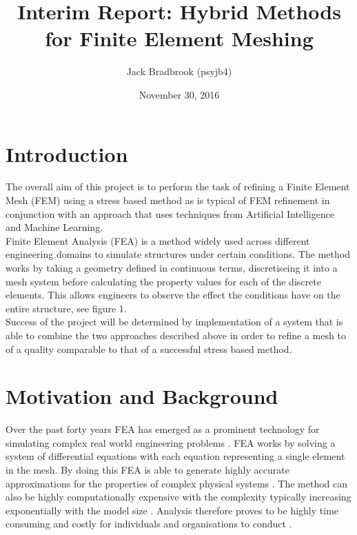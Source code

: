 \documentclass{article}
\begin{document}

\title{Interim Report: Hybrid Methods for Finite Element Meshing}
\author{Jack Bradbrook (psyjb4)}
\date{November 30, 2016}
\maketitle

\tableofcontents

\newpage

\section{Introduction}

The overall aim of this project is to perform the task of refining a Finite Element Mesh (FEM) using a stress based method as is typical of FEM refinement in conjunction with an approach that uses techniques from Artificial Intelligence and Machine Learning. \\

\noindent
Finite Element Analysis (FEA) is a method widely used across different engineering domains to simulate structures under certain conditions. The method works by taking a geometry defined in continuous terms, discretiseing it into a mesh system before calculating the property values for each of the discrete elements. This allows engineers to observe the effect the conditions have on the entire structure, see figure 1. \\ 

\noindent
Success of the project will be determined by implementation of a system that is able to combine the two approaches described above in order to refine a mesh to of a quality comparable to that of a successful stress based method.


\section{Motivation and Background}

Over the past forty years FEA has emerged as a prominent technology for simulating complex real world engineering problems \cite{cite0, DolsakPaper94}. FEA works by solving a system of differential equations with each equation representing a single element in the mesh. By doing this FEA is able to generate highly accurate approximations for the properties of complex physical systems \cite{DolsakPaper94} \cite{IntroductionToFE}. The method can also be highly computationally expensive with the complexity typically increasing exponentially with the model size \cite{DolsakPaper94}. Analysis therefore proves to be highly time consuming and costly for individuals and organisations to conduct \cite{ConsultRuleIntelltSystemFE}. \cite{cite03}\\
\end{document}
